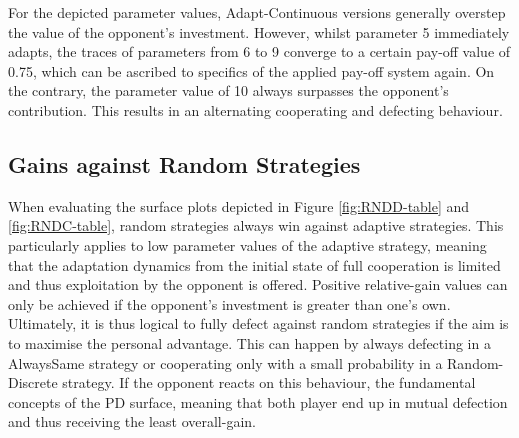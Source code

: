 \documentclass[11pt]{article}
\begin{document}
	\noindent
	For the depicted parameter values, Adapt-Continuous versions generally overstep the value of the opponent's investment.
	However, whilst parameter 5 immediately adapts, the traces of parameters from 6 to 9 converge to a certain pay-off value of 0.75, which can be ascribed to specifics of the applied pay-off system again.
	On the contrary, the parameter value of 10 always surpasses the opponent's contribution.
	This results in an alternating cooperating and defecting behaviour.
	

\subsection{Gains against Random Strategies}
	When evaluating the surface plots depicted in Figure \ref{fig:RNDD-table} and \ref{fig:RNDC-table}, random strategies always win against adaptive strategies.
	This particularly applies to low parameter values of the adaptive strategy, meaning that the adaptation dynamics from the initial state of full cooperation is limited and thus exploitation by the opponent is offered.
	Positive relative-gain values can only be achieved if the opponent's investment is greater than one's own.
	Ultimately, it is thus logical to fully defect against random strategies if the aim is to maximise the personal advantage.
	This can happen by always defecting in a AlwaysSame strategy or cooperating only with a small probability in a Random-Discrete strategy.
	If the opponent reacts on this behaviour, the fundamental concepts of the PD surface, meaning that both player end up in mutual defection and thus receiving the least overall-gain.
\end{document}
